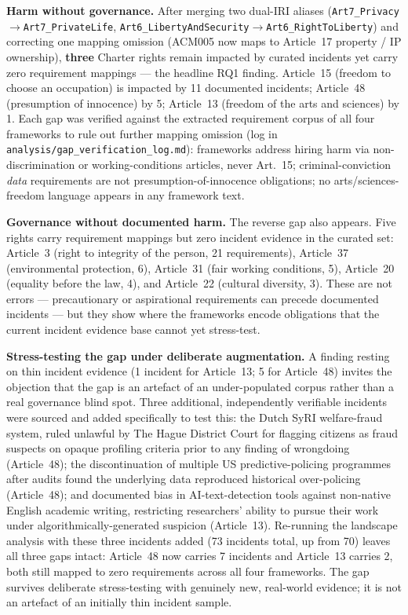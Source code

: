 \textbf{Harm without governance.} After merging two dual-IRI aliases (\texttt{Art7\_Privacy}$\rightarrow$\texttt{Art7\_PrivateLife}, \texttt{Art6\_LibertyAndSecurity}$\rightarrow$\texttt{Art6\_RightToLiberty}) and correcting one mapping omission (ACM005 now maps to Article~17 property / IP ownership), \textbf{three} Charter rights remain impacted by curated incidents yet carry zero requirement mappings --- the headline RQ1 finding. Article~15 (freedom to choose an occupation) is impacted by 11 documented incidents; Article~48 (presumption of innocence) by 5; Article~13 (freedom of the arts and sciences) by 1. Each gap was verified against the extracted requirement corpus of all four frameworks to rule out further mapping omission (log in \texttt{analysis/gap\_verification\_log.md}): frameworks address hiring harm via non-discrimination or working-conditions articles, never Art.~15; criminal-conviction \emph{data} requirements are not presumption-of-innocence obligations; no arts/sciences-freedom language appears in any framework text.

\textbf{Governance without documented harm.} The reverse gap also appears. Five rights carry requirement mappings but zero incident evidence in the curated set: Article~3 (right to integrity of the person, 21 requirements), Article~37 (environmental protection, 6), Article~31 (fair working conditions, 5), Article~20 (equality before the law, 4), and Article~22 (cultural diversity, 3). These are not errors --- precautionary or aspirational requirements can precede documented incidents --- but they show where the frameworks encode obligations that the current incident evidence base cannot yet stress-test.

\textbf{Stress-testing the gap under deliberate augmentation.} A finding resting on thin incident evidence (1 incident for Article~13; 5 for Article~48) invites the objection that the gap is an artefact of an under-populated corpus rather than a real governance blind spot. Three additional, independently verifiable incidents were sourced and added specifically to test this: the Dutch SyRI welfare-fraud system, ruled unlawful by The Hague District Court for flagging citizens as fraud suspects on opaque profiling criteria prior to any finding of wrongdoing (Article~48); the discontinuation of multiple US predictive-policing programmes after audits found the underlying data reproduced historical over-policing (Article~48); and documented bias in AI-text-detection tools against non-native English academic writing, restricting researchers' ability to pursue their work under algorithmically-generated suspicion \cite{liang2023gpt} (Article~13). Re-running the landscape analysis with these three incidents added (73 incidents total, up from 70) leaves all three gaps intact: Article~48 now carries 7 incidents and Article~13 carries 2, both still mapped to zero requirements across all four frameworks. The gap survives deliberate stress-testing with genuinely new, real-world evidence; it is not an artefact of an initially thin incident sample.

